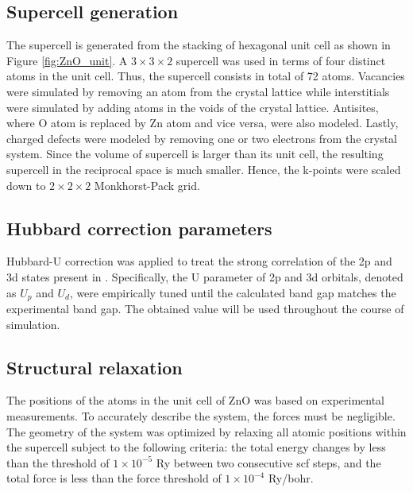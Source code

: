     \subsection{Supercell generation}
    The supercell is generated from the stacking of hexagonal  unit cell as  shown in Figure \ref{fig:ZnO_unit}. A $3 \times 3 \times 2$ supercell was used in terms of four distinct atoms in the unit cell. Thus, the supercell consists in total of 72 atoms. Vacancies were simulated by removing an atom from the crystal lattice while interstitials were simulated by adding atoms in the voids of the crystal lattice. Antisites, where O atom is replaced by Zn atom and vice versa, were also modeled. Lastly, charged defects were modeled by removing one or two electrons from the crystal system. Since the volume of supercell is larger than its unit cell, the resulting supercell in the reciprocal space is much smaller. Hence, the k-points were scaled down to $2 \times 2 \times 2$ Monkhorst-Pack grid.  

    \subsection{Hubbard correction parameters}
    Hubbard-U correction was applied to treat the strong correlation of the 2p and 3d states present in . Specifically, the U parameter of 2p and 3d orbitals, denoted as $U_{p}$ and $U_{d}$, were empirically tuned until the calculated band gap matches the experimental band gap. The obtained value will be used throughout the course of simulation.  

    \subsection{Structural relaxation}
    The positions of the atoms in the unit cell of ZnO was based on experimental measurements.  To accurately describe the system, the forces must be negligible. The geometry of the system was optimized by relaxing all atomic positions within the supercell subject to the following criteria: the total energy changes by less than the threshold of $1 \times 10^{-5}$ Ry between two consecutive scf steps, and the total force is less than the force threshold of $1 \times 10^{-4}$ Ry/bohr. 


